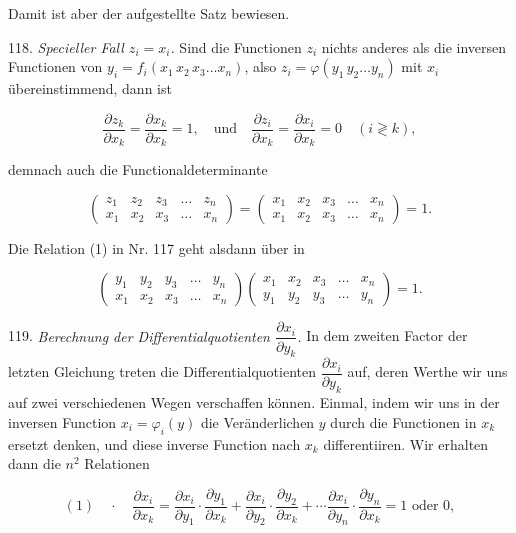 Damit ist aber der aufgestellte Satz bewiesen.

118. \textit{Specieller Fall $z_i = x_i$.} Sind die Functionen $z_i$ nichts
anderes als die inversen Functionen von $y_i = f_i(x_1\, x_2\, x_3 \ldots x_n)$, also
$z_i = \varphi(y_1\, y_2 \ldots y_n)$ mit $x_i$ übereinstimmend, dann ist

\[
\dfrac{\partial z_k}{\partial x_k} = \dfrac{\partial x_k}{\partial x_k} = 1, \quad \text{und} \quad \dfrac{\partial z_i}{\partial x_k} = \dfrac{\partial x_i}{\partial x_k} = 0 \quad (i \gtrless k),
\]

demnach auch die Functionaldeterminante

\[
\begin{pmatrix} z_1 & z_2 & z_3 & \ldots & z_n \\ x_1 & x_2 & x_3 & \ldots & x_n \end{pmatrix}
=
\begin{pmatrix} x_1 & x_2 & x_3 & \ldots & x_n \\ x_1 & x_2 & x_3 & \ldots & x_n \end{pmatrix}
= 1.
\]

Die Relation (1) in Nr. 117 geht alsdann über in

\[
\begin{pmatrix} y_1 & y_2 & y_3 & \ldots & y_n \\ x_1 & x_2 & x_3 & \ldots & x_n \end{pmatrix}
\begin{pmatrix} x_1 & x_2 & x_3 & \ldots & x_n \\ y_1 & y_2 & y_3 & \ldots & y_n \end{pmatrix}
= 1.
\]

119. \textit{Berechnung der Differentialquotienten $\dfrac{\partial x_i}{\partial y_k}$.} In dem zweiten
Factor der letzten Gleichung treten die Differentialquotienten $\dfrac{\partial x_i}{\partial y_k}$ auf,
deren Werthe wir uns auf zwei verschiedenen Wegen verschaffen
können. Einmal, indem wir uns in der inversen Function $x_i = \varphi_i(y)$
die Veränderlichen $y$ durch die Functionen in $x_k$ ersetzt denken, und
diese inverse Function nach $x_k$ differentiiren. Wir erhalten dann die
$n^2$ Relationen

\[
(1) \quad\cdot\quad \dfrac{\partial x_i}{\partial x_k} = \dfrac{\partial x_i}{\partial y_1}\cdot\dfrac{\partial y_1}{\partial x_k} + \dfrac{\partial x_i}{\partial y_2}\cdot\dfrac{\partial y_2}{\partial x_k} + \cdots \dfrac{\partial x_i}{\partial y_n}\cdot\dfrac{\partial y_n}{\partial x_k} = 1 \text{ oder } 0,
\]

